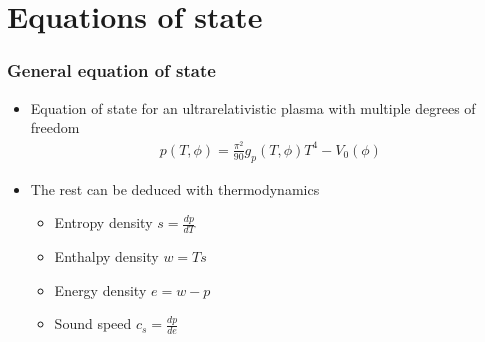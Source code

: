 \section{Equations of state}

\begin{frame}
    \frametitle{General equation of state}
    \begin{itemize}
        \item Equation of state for an ultrarelativistic plasma with multiple degrees of freedom
        \begin{align}
            p(T,\phi) = \frac{\pi^2}{90} g_p(T,\phi) T^4 - V_0(\phi)
        \end{align}
        \item The rest can be deduced with thermodynamics
        \begin{itemize}
            \item Entropy density $s = \frac{dp}{dT}$
            \item Enthalpy density $w = Ts$
            \item Energy density $e = w - p$
            \item Sound speed $c_s = \frac{dp}{de}$
        \end{itemize}
    \end{itemize}
\end{frame}

